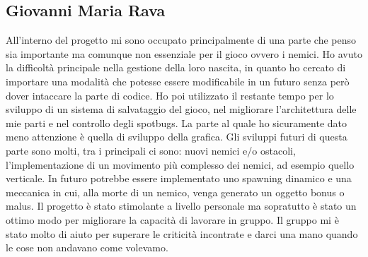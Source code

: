 \documentclass[a4paper,12pt]{report}
\begin{document}
\subsection{Giovanni Maria Rava}
All'interno del progetto mi sono occupato principalmente di una parte che penso sia importante ma comunque non essenziale per il 
gioco ovvero i nemici. Ho avuto la difficoltà principale nella gestione della loro nascita, in quanto ho cercato di importare una 
modalità che potesse essere modificabile in un futuro senza però dover intaccare la parte di codice. Ho poi utilizzato il restante
tempo per lo sviluppo di un sistema di salvataggio del gioco, nel migliorare l'architettura delle mie parti e nel controllo degli 
spotbugs. La parte al quale ho sicuramente dato meno attenzione è quella di sviluppo della grafica. Gli sviluppi futuri di questa 
parte sono molti, tra i principali  ci sono: nuovi nemici e/o ostacoli, l'implementazione di un movimento più complesso dei nemici,
ad esempio quello verticale. In futuro potrebbe essere implementato uno spawning dinamico e una meccanica in cui, alla morte di un
nemico, venga generato un oggetto bonus o malus.
Il progetto è stato stimolante a livello personale ma sopratutto è stato un ottimo modo per migliorare la capacità di lavorare in 
gruppo. Il gruppo mi è stato molto di aiuto per superare le criticità incontrate e darci una mano quando le cose non andavano come 
volevamo.
\appendix
\end{document}
